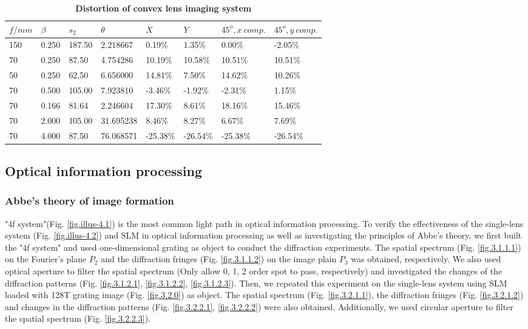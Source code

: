 \documentclass[10pt,a4paper,twocolumn,twoside,UTF8]{article}
\begin{document}
	\begin{table}[htbp]
		\centering
		\caption{\textbf{Distortion of convex lens imaging system}}
		\label{tab.2.1}
			\begin{tabular}{llllllll}
				\toprule
				$f/mm$ &  $\beta$	&$s_2$	&$\theta$ &$X$ &$Y$ &$45^o, x\ comp.$ &$45^o, y\ comp.$ \\
				\midrule
				150 & 0.250 & 187.50 &  2.218667 &   0.19\% &   1.35\% &   0.00\% &  -2.05\% \\
				70 & 0.250 &  87.50 &  4.754286 &  10.19\% &  10.58\% &  10.51\% &  10.51\% \\
				50 & 0.250 &  62.50 &  6.656000 &  14.81\% &   7.50\% &  14.62\% &  10.26\% \\
				70 & 0.500 & 105.00 &  7.923810 &  -3.46\% &  -1.92\% &  -2.31\% &   1.15\% \\
				70 & 0.166 &  81.64 &  2.246604 &  17.30\% &   8.61\% &  18.16\% &  15.46\% \\
				70 & 2.000 & 105.00 & 31.695238 &   8.46\% &   8.27\% &   6.67\% &   7.69\% \\
				70 & 4.000 &  87.50 & 76.068571 & -25.38\% & -26.54\% & -25.38\% & -26.54\% \\
				\bottomrule
			\end{tabular}
	\end{table}

	\subsection{Optical information processing}
		\subsubsection{Abbe's theory of image formation}
		"4f system"(Fig. \ref{fig.illus-4.1}) is the most common light path in optical information processing. 
		To verify the effectiveness of the single-lens system (Fig. \ref{fig.illus-4.2}) and SLM in optical information processing as well as investigating the principles of Abbe's theory,
		we first built the "4f system" and used one-dimensional grating as object to conduct the diffraction experiments. 
		The spatial spectrum (Fig. \ref{fig.3.1.1.1}) on the Fourier's plane $P_2$ and the diffraction fringes (Fig. \ref{fig.3.1.1.2}) on the image plain $P_3$ was obtained, respectively.
		We also used optical aperture to filter the spatial spectrum (Only allow 0, 1, 2 order spot to pass, respectively) and investigated the changes of the diffraction patterns (Fig. \ref{fig.3.1.2.1}, \ref{fig.3.1.2.2}, \ref{fig.3.1.2.3}).
		Then, we repeated this experiment on the single-lens system using SLM loaded with 128T grating image (Fig. \ref{fig.3.2.0}) as object. 
		The spatial spectrum (Fig. \ref{fig.3.2.1.1}), the diffraction fringes (Fig. \ref{fig.3.2.1.2}) and changes in the diffraction patterns (Fig. \ref{fig.3.2.2.1}, \ref{fig.3.2.2.2}) were also obtained.
		Additionally, we used circular aperture to filter the spatial spectrum (Fig. \ref{fig.3.2.2.3}).
\end{document}
